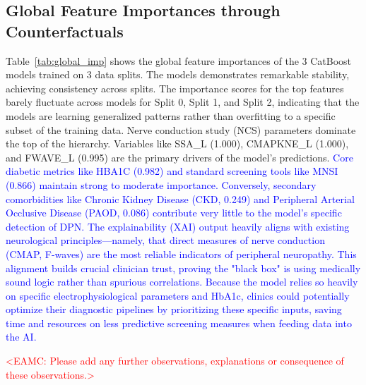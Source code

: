\documentclass[fleqn,10pt]{wlscirep}
\begin{document}
\subsection*{Global Feature Importances through Counterfactuals}
Table~\ref{tab:global_imp} shows the global feature importances of the 3 CatBoost models trained on 3 data splits. The models demonstrates remarkable stability, achieving consistency across splits. The importance scores for the top features barely fluctuate across models for Split 0, Split 1, and Split 2, indicating that the models are learning generalized patterns rather than overfitting to a specific subset of the training data. Nerve conduction study (NCS) parameters dominate the top of the hierarchy. Variables like SSA\_L (1.000), CMAPKNE\_L (1.000), and FWAVE\_L (0.995) are the primary drivers of the model's predictions. \textcolor{blue}{Core diabetic metrics like HBA1C (0.982) and standard screening tools like MNSI (0.866) maintain strong to moderate importance. Conversely, secondary comorbidities like Chronic Kidney Disease (CKD, 0.249) and Peripheral Arterial Occlusive Disease (PAOD, 0.086) contribute very little to the model's specific detection of DPN. The explainability (XAI) output heavily aligns with existing neurological principles—namely, that direct measures of nerve conduction (CMAP, F-waves) are the most reliable indicators of peripheral neuropathy. This alignment builds crucial clinician trust, proving the "black box" is using medically sound logic rather than spurious correlations. Because the model relies so heavily on specific electrophysiological parameters and HbA1c, clinics could potentially optimize their diagnostic pipelines by prioritizing these specific inputs, saving time and resources on less predictive screening measures when feeding data into the AI.}

\textcolor{red}{<EAMC: Please add any further observations, explanations or consequence of these observations.>}
\end{document}

